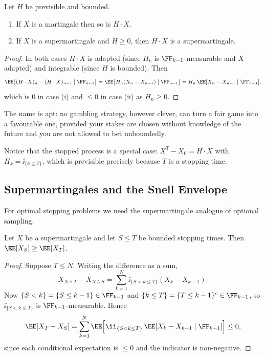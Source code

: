 \begin{theorem}\label{thm:transform}
	Let $H$ be previsible and bounded.
	\begin{enumerate}[label=(\roman*)]
		\item If $X$ is a martingale then so is $H \cdot X$.
		\item If $X$ is a supermartingale and $H \geq 0$, then $H\cdot X$ is a supermartingale.
	\end{enumerate}
\end{theorem}

\begin{proof}
	In both cases $H\cdot X$ is adapted (since $H_k$ is $\FF_{k-1}$-measurable and $X$ adapted) and integrable (since $H$ is bounded). Then
	$$
	\EE\big[(H\cdot X)_n - (H\cdot X)_{n-1}\mid\FF_{n-1}\big] = \EE\big[H_n(X_n-X_{n-1})\mid\FF_{n-1}\big] = H_n\,\EE[X_n - X_{n-1}\mid\FF_{n-1}],
	$$
	which is $0$ in case (i) and $\leq 0$ in case (ii) as $H_n \geq 0$.
\end{proof}

The name is apt: no gambling strategy, however clever, can turn a fair game into a favourable one, provided your stakes are chosen without knowledge of the future and you are not allowed to bet unboundedly.

Notice that the stopped process is a special case: $X^T - X_0 = H\cdot X$ with $H_k = \ii_{\{k\leq T\}}$, which is previsible precisely because $T$ is a stopping time.

\subsection{Supermartingales and the Snell Envelope}

For optimal stopping problems we need the supermartingale analogue of optional sampling.

\begin{theorem}\label{thm:oss-super}
	Let $X$ be a supermartingale and let $S \leq T$ be bounded stopping times. Then $\EE[X_S]\geq\EE[X_T]$.
\end{theorem}

\begin{proof}
	Suppose $T \leq N$. Writing the difference as a sum,
	$$
	X_{N\wedge T} - X_{N \wedge S} = \sum_{k=1}^{N}\ii_{\{S < k \leq T\}}(X_k - X_{k-1}).
	$$
	Now $\{S<k\} = \{S\leq k-1\}\in\FF_{k-1}$ and $\{k\leq T\} = \{T\leq k-1\}^c\in\FF_{k-1}$, so $\ii_{\{S<k\leq T\}}$ is $\FF_{k-1}$-measurable. Hence
	$$
	\EE[X_T - X_S] = \sum_{k=1}^N\EE\Big[\ii_{\{S<k\leq T\}}\,\EE[X_k - X_{k-1}\mid\FF_{k-1}]\Big] \leq 0,
	$$
	since each conditional expectation is $\leq 0$ and the indicator is non-negative.
\end{proof}

